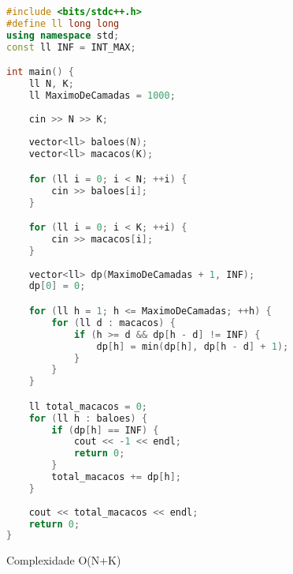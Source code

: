 \begin{lstlisting}[language=C++]
#include <bits/stdc++.h>
#define ll long long
using namespace std;
const ll INF = INT_MAX;

int main() {
    ll N, K;
    ll MaximoDeCamadas = 1000;
    
    cin >> N >> K;
    
    vector<ll> baloes(N);
    vector<ll> macacos(K);

    for (ll i = 0; i < N; ++i) {
        cin >> baloes[i];
    }

    for (ll i = 0; i < K; ++i) {
        cin >> macacos[i];
    }
    
    vector<ll> dp(MaximoDeCamadas + 1, INF);
    dp[0] = 0;

    for (ll h = 1; h <= MaximoDeCamadas; ++h) {
        for (ll d : macacos) {
            if (h >= d && dp[h - d] != INF) {
                dp[h] = min(dp[h], dp[h - d] + 1);
            }
        }
    }

    ll total_macacos = 0;
    for (ll h : baloes) {
        if (dp[h] == INF) {
            cout << -1 << endl;
            return 0;
        }
        total_macacos += dp[h];
    }
    
    cout << total_macacos << endl;
    return 0;
}
\end{lstlisting}

Complexidade O(N+K)
